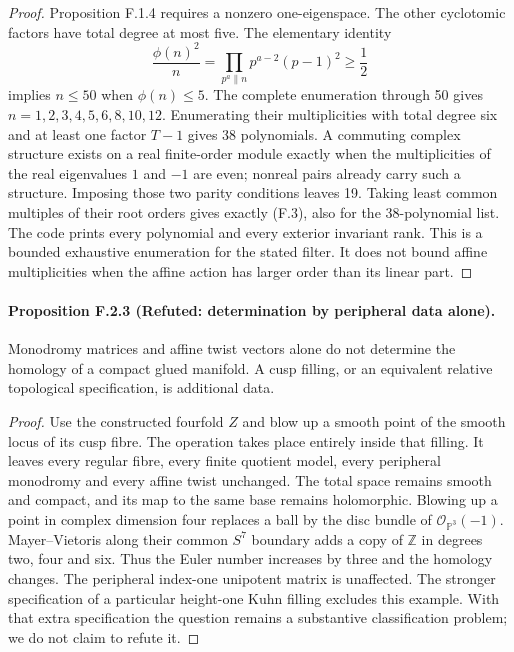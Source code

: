 \begin{proof}
Proposition F.1.4 requires a nonzero one-eigenspace.  The other
cyclotomic factors have total degree at most five.  The elementary
identity
\[
 \frac{\phi(n)^2}{n}=
 \prod_{p^a\parallel n}p^{a-2}(p-1)^2\geq\frac12
\]
implies $n\leq50$ when $\phi(n)\leq5$.
The complete enumeration through 50 gives
$n=1,2,3,4,5,6,8,10,12$.  Enumerating their multiplicities
with total degree six and at least one factor $T-1$ gives 38
polynomials.  A commuting complex structure exists on a real
finite-order module exactly when the multiplicities of the
real eigenvalues $1$ and $-1$ are even; nonreal pairs already
carry such a structure.  Imposing those two parity conditions
leaves 19.  Taking least common multiples of their root orders
gives exactly (F.3), also for the 38-polynomial list.
The code prints every polynomial and every exterior invariant
rank.  This is a bounded exhaustive enumeration for the
stated filter.  It does not bound affine multiplicities when
the affine action has larger order than its linear part.
\end{proof}

\paragraph{Proposition F.2.3 (Refuted: determination by peripheral data alone).}
Monodromy matrices and affine twist vectors alone do not
determine the homology of a compact glued manifold.  A cusp
filling, or an equivalent relative topological specification,
is additional data.

\begin{proof}
Use the constructed fourfold $Z$ and blow up a smooth point
of the smooth locus of its cusp fibre.  The operation takes
place entirely inside that filling.  It leaves every regular
fibre, every finite quotient model, every peripheral monodromy
and every affine twist unchanged.  The total space remains
smooth and compact, and its map to the same base remains
holomorphic.  Blowing up a point in complex dimension four
replaces a ball by the disc bundle of $\mathcal O_{\mathbb P^3}(-1)$.
Mayer--Vietoris along their common $S^7$ boundary adds a copy
of $\mathbb Z$ in degrees two, four and six.  Thus the Euler
number increases by three and the homology changes.  The
peripheral index-one unipotent matrix is unaffected.
The stronger specification of a particular height-one Kuhn
filling excludes this example.  With that extra specification
the question remains a substantive classification problem;
we do not claim to refute it.
\end{proof}

